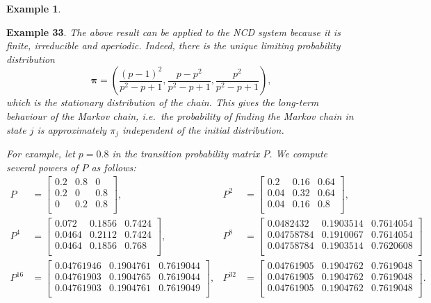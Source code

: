 \documentclass[
]{book}
\theoremstyle{definition}
\theoremstyle{definition}
\newtheorem{example}{Example}[chapter]
\theoremstyle{definition}
\theoremstyle{definition}
\theoremstyle{remark}
\begin{document}
\begin{example}
\protect\hypertarget{exm:unlabeled-div-35}{}\label{exm:unlabeled-div-35}

\textbf{Example 33}. \emph{The above result can be applied to the NCD system
because it is finite, irreducible and aperiodic. Indeed, there is the
unique limiting probability distribution
\[\boldsymbol{\pi} = \left(\frac{(p-1)^2}{p^2 - p +1}, \frac{p - p^2}{p^2 - p +1}, \frac{p^2}{p^2 - p +1}\right),\]
which is the stationary distribution of the chain. This gives the
long-term behaviour of the Markov chain, i.e.~the probability of finding
the Markov chain in state \(j\) is approximately \(\pi_j\) independent of
the initial distribution.}

\emph{For example, let \(p = 0.8\) in the transition probability matrix \(P\).
We compute several powers of \(P\) as follows: \[\begin{aligned}
P &= \begin{bmatrix}
0.2 & 0.8 & 0\\
0.2 & 0 & 0.8\\
0 & 0.2 & 0.8\\
\end{bmatrix}
,  &
P^2 &= \begin{bmatrix}
0.2 & 0.16 & 0.64\\
0.04 & 0.32 & 0.64\\
0.04 & 0.16 & 0.8\\
\end{bmatrix}, \\
P^4 &= \begin{bmatrix}
0.072 & 0.1856 & 0.7424\\
0.0464 & 0.2112 & 0.7424\\
0.0464 & 0.1856 & 0.768\\
\end{bmatrix}
,  &
P^8 &= \begin{bmatrix}
0.0482432 & 0.1903514 & 0.7614054\\
0.04758784 & 0.1910067 & 0.7614054\\
0.04758784 & 0.1903514 & 0.7620608\\
\end{bmatrix} \\
P^{16} &= \begin{bmatrix}
0.04761946 & 0.1904761 & 0.7619044\\
0.04761903 & 0.1904765 & 0.7619044\\
0.04761903 & 0.1904761 & 0.7619049\\
\end{bmatrix}
,  &
P^{32} &= \begin{bmatrix}
0.04761905 & 0.1904762 & 0.7619048\\
0.04761905 & 0.1904762 & 0.7619048\\
0.04761905 & 0.1904762 & 0.7619048\\
\end{bmatrix}.\end{aligned}\]}

\end{example}
\end{document}
